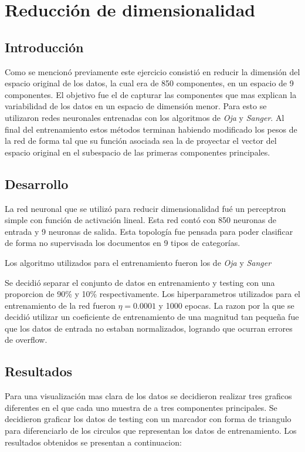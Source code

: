 \section{Reducción de dimensionalidad}

\subsection{Introducción}
Como se mencionó previamente este ejercicio consistió en reducir la dimensión del
espacio original de los datos, la cual era de 850 componentes,
en un espacio de 9 componentes. El objetivo fue el de capturar las componentes
que mas explican la variabilidad de los datos en un espacio de dimensión menor.
Para esto se utilizaron redes neuronales entrenadas con los algoritmos de
\textit{Oja} y \textit{Sanger}. Al final del entrenamiento estos métodos terminan
habiendo modificado los pesos de la red de forma tal que su función asociada sea la de
proyectar el vector del espacio original en el subespacio de las primeras
componentes principales.

\subsection{Desarrollo}
La red neuronal que se utilizó para reducir dimensionalidad fué un perceptron
simple con función de activación lineal. Esta red contó con 850 neuronas de
entrada y 9 neuronas de salida. Esta topología fue pensada para poder clasificar
de forma no supervisada los documentos en 9 tipos de categorías.

Los algoritmo utilizados para el entrenamiento fueron los de \textit{Oja} y
 \textit{Sanger}

Se decidió separar el conjunto de datos en entrenamiento y testing con una
proporcion de 90\% y 10\% respectivamente. Los hiperparametros utilizados para
el entrenamiento de la red fueron $\eta = 0.0001$ y 1000 epocas. La razon por la
que se decidió utilizar un coeficiente de entrenamiento de una magnitud tan
pequeña fue que los datos de entrada no estaban normalizados, logrando que
ocurran errores de overflow.

\subsection{Resultados}
Para una visualización mas clara de los datos se decidieron realizar tres
graficos diferentes en el que cada uno muestra de a tres componentes
principales. Se decidieron graficar los datos de testing con un marcador con
forma de triangulo para diferenciarlo de los circulos que representan los datos
de entrenamiento. Los resultados obtenidos se presentan a continuacion:


